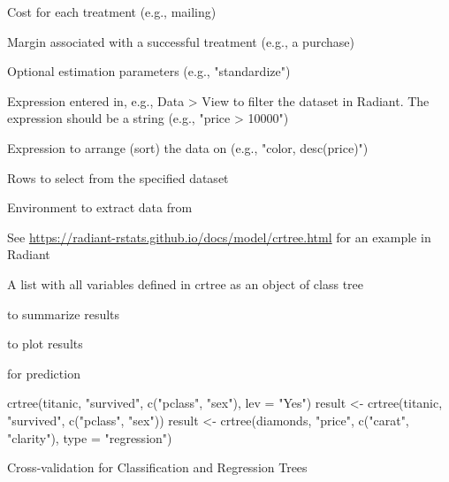 \documentclass[a4paper]{book}
\begin{document}
\begin{Arguments}
\begin{ldescription}
\item[\code{cost}] Cost for each treatment (e.g., mailing)

\item[\code{margin}] Margin associated with a successful treatment (e.g., a purchase)

\item[\code{check}] Optional estimation parameters (e.g., "standardize")

\item[\code{data\_filter}] Expression entered in, e.g., Data > View to filter the dataset in Radiant. The expression should be a string (e.g., "price > 10000")

\item[\code{arr}] Expression to arrange (sort) the data on (e.g., "color, desc(price)")

\item[\code{rows}] Rows to select from the specified dataset

\item[\code{envir}] Environment to extract data from
\end{ldescription}
\end{Arguments}
%
\begin{Details}
See \url{https://radiant-rstats.github.io/docs/model/crtree.html} for an example in Radiant
\end{Details}
%
\begin{Value}
A list with all variables defined in crtree as an object of class tree
\end{Value}
%
\begin{SeeAlso}
 to summarize results

 to plot results

 for prediction
\end{SeeAlso}
%
\begin{Examples}
\begin{ExampleCode}
crtree(titanic, "survived", c("pclass", "sex"), lev = "Yes") %
result <- crtree(titanic, "survived", c("pclass", "sex")) %
result <- crtree(diamonds, "price", c("carat", "clarity"), type = "regression") %
\end{ExampleCode}
\end{Examples}
%
\begin{Description}
Cross-validation for Classification and Regression Trees
\end{Description}
\end{document}
